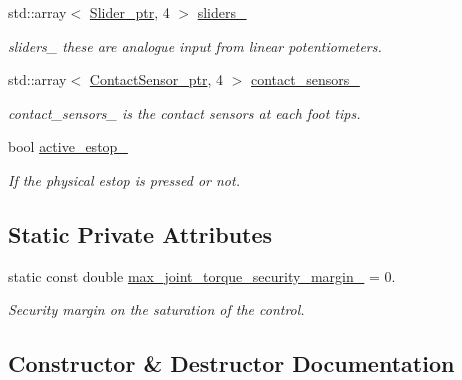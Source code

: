 \begin{DoxyCompactItemize}
std\+::array$<$ \hyperlink{common__header_8hpp_a4cb9a95e8b2c0bf237ce29f5252c7b73}{Slider\+\_\+ptr}, 4 $>$ \hyperlink{classblmc__robots_1_1Solo8_a4f372b7f79a81142a4e99e1ae6da44a2}{sliders\+\_\+}
\begin{DoxyCompactList}\small\item\em sliders\+\_\+ these are analogue input from linear potentiometers. \end{DoxyCompactList}\item 
std\+::array$<$ \hyperlink{common__header_8hpp_ac78fe5c68e56a3b884117109959e4d58}{Contact\+Sensor\+\_\+ptr}, 4 $>$ \hyperlink{classblmc__robots_1_1Solo8_a67076041a87ea12b1a22d7f1759c759e}{contact\+\_\+sensors\+\_\+}
\begin{DoxyCompactList}\small\item\em contact\+\_\+sensors\+\_\+ is the contact sensors at each foot tips. \end{DoxyCompactList}\item 
bool \hyperlink{classblmc__robots_1_1Solo8_a25153421bca095a344408e055f3794b6}{active\+\_\+estop\+\_\+}
\begin{DoxyCompactList}\small\item\em If the physical estop is pressed or not. \end{DoxyCompactList}\end{DoxyCompactItemize}
\subsection*{Static Private Attributes}
\begin{DoxyCompactItemize}
\item 
static const double \hyperlink{classblmc__robots_1_1Solo8_addc990242a0e96c40edc629883541be7}{max\+\_\+joint\+\_\+torque\+\_\+security\+\_\+margin\+\_\+} = 0.
\begin{DoxyCompactList}\small\item\em Security margin on the saturation of the control. \end{DoxyCompactList}\end{DoxyCompactItemize}


\subsection{Constructor \& Destructor Documentation}
\mbox{\label{classblmc__robots_1_1Solo8_ab37c2e406f12685fcb4e09086ee7c0c0}} 
